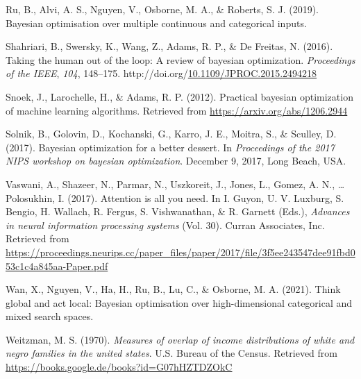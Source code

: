 \documentclass[12pt,twoside]{reedthesis}
\newlength{\cslhangindent}
\newenvironment{CSLReferences}[2] %
 {%
  \setlength{\parindent}{0pt}
  \ifodd #1 \everypar{\setlength{\hangindent}{\cslhangindent}}\ignorespaces\fi
  \ifnum #2 > 0
  \setlength{\parskip}{#2\baselineskip}
  \fi
 }%
 {}
\begin{document}
\begin{CSLReferences}{1}{0}
\leavevmode{}%
Ru, B., Alvi, A. S., Nguyen, V., Osborne, M. A., \& Roberts, S. J. (2019). Bayesian optimisation over multiple continuous and categorical inputs.

\leavevmode{}%
Shahriari, B., Swersky, K., Wang, Z., Adams, R. P., \& De Freitas, N. (2016). Taking the human out of the loop: A review of bayesian optimization. \emph{Proceedings of the IEEE}, \emph{104}, 148--175. http://doi.org/\href{https://doi.org/10.1109/JPROC.2015.2494218}{10.1109/JPROC.2015.2494218}

\leavevmode{}%
Snoek, J., Larochelle, H., \& Adams, R. P. (2012). Practical bayesian optimization of machine learning algorithms. Retrieved from \url{https://arxiv.org/abs/1206.2944}

\leavevmode{}%
Solnik, B., Golovin, D., Kochanski, G., Karro, J. E., Moitra, S., \& Sculley, D. (2017). Bayesian optimization for a better dessert. In \emph{Proceedings of the 2017 NIPS workshop on bayesian optimization}. December 9, 2017, Long Beach, USA.

\leavevmode{}%
Vaswani, A., Shazeer, N., Parmar, N., Uszkoreit, J., Jones, L., Gomez, A. N., \ldots{} Polosukhin, I. (2017). Attention is all you need. In I. Guyon, U. V. Luxburg, S. Bengio, H. Wallach, R. Fergus, S. Vishwanathan, \& R. Garnett (Eds.), \emph{Advances in neural information processing systems} (Vol. 30). Curran Associates, Inc. Retrieved from \url{https://proceedings.neurips.cc/paper_files/paper/2017/file/3f5ee243547dee91fbd053c1c4a845aa-Paper.pdf}

\leavevmode{}%
Wan, X., Nguyen, V., Ha, H., Ru, B., Lu, C., \& Osborne, M. A. (2021). Think global and act local: Bayesian optimisation over high-dimensional categorical and mixed search spaces.

\leavevmode{}%
Weitzman, M. S. (1970). \emph{Measures of overlap of income distributions of white and negro families in the united states}. U.S. Bureau of the Census. Retrieved from \url{https://books.google.de/books?id=G07hHZTDZOkC}

\end{CSLReferences}
\end{document}
